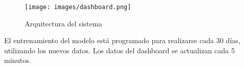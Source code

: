 \documentclass[12pt]{article}
\begin{document}
\begin{figure}[H]
    \centering
    \texttt{[image: images/dashboard.png]}
    \caption{Arquitectura del sistema}
    \label{fig:architecture}
\end{figure}

El entrenamiento del modelo está programado para realizarse cada 30 días, utilizando los nuevos datos. Los datos del dashboard se actualizan cada 5 minutos.










\printbibliography
\end{document}

